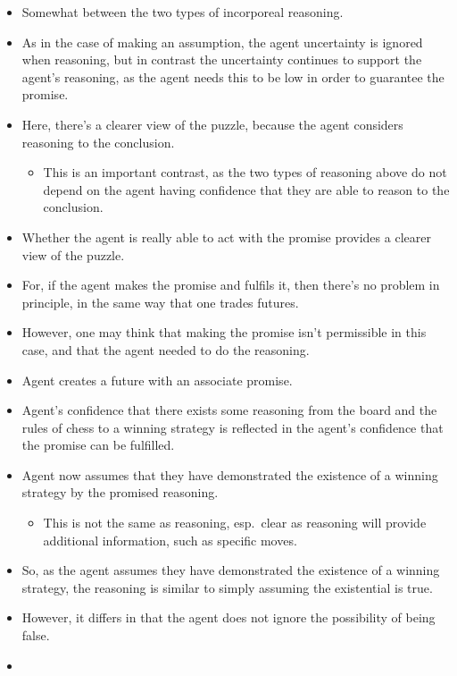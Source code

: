 \documentclass[10pt]{article}
\begin{document}
\begin{note}
  \begin{itemize}
  \item Somewhat between the two types of incorporeal reasoning.
  \item As in the case of making an assumption, the agent uncertainty is ignored when reasoning, but in contrast the uncertainty continues to support the agent's reasoning, as the agent needs this to be low in order to guarantee the promise.
  \item Here, there's a clearer view of the puzzle, because the agent considers reasoning to the conclusion.
    \begin{itemize}
    \item This is an important contrast, as the two types of reasoning above do not depend on the agent having confidence that they are able to reason to the conclusion.
    \end{itemize}
  \item Whether the agent is really able to act with the promise provides a clearer view of the puzzle.
  \item For, if the agent makes the promise and fulfils it, then there's no problem in principle, in the same way that one trades futures.
  \item However, one may think that making the promise isn't permissible in this case, and that the agent needed to do the reasoning.
  \end{itemize}
\end{note}
\begin{itemize}
\item Agent creates a future with an associate promise.
\item Agent's confidence that there exists some reasoning from the board and the rules of chess to a winning strategy is reflected in the agent's confidence that the promise can be fulfilled.
\item Agent now assumes that they have demonstrated the existence of a winning strategy by the promised reasoning.
  \begin{itemize}
  \item This is not the same as reasoning, esp.\ clear as reasoning will provide additional information, such as specific moves.
  \end{itemize}
\item So, as the agent assumes they have demonstrated the existence of a winning strategy, the reasoning is similar to simply assuming the existential is true.
\item However, it differs in that the agent does not ignore the possibility of being false.
\item 
\end{itemize}
\end{document}
